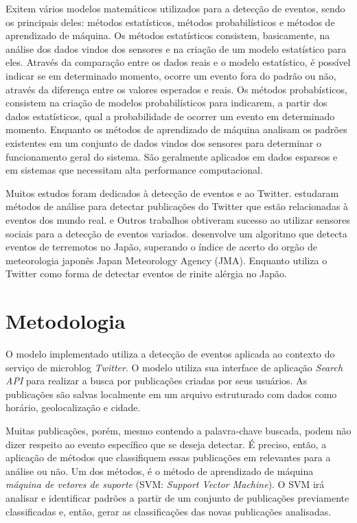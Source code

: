 Exitem vários modelos matemáticos utilizados para a detecção de eventos, sendo os principais deles: métodos estatísticos, métodos probabilísticos e métodos de aprendizado de máquina. Os métodos estatísticos consistem, basicamente, na análise dos dados vindos dos sensores e na criação de um modelo estatístico para eles. Através da comparação entre os dados reais e o modelo estatístico, é possível indicar se em determinado momento, ocorre um evento fora do padrão ou não, através da diferença entre os valores esperados e reais. Os métodos probabísticos, consistem na criação de modelos probabilísticos para indicarem, a partir dos dados estatísticos, qual a probabilidade de ocorrer um evento em determinado momento. Enquanto os métodos de aprendizado de máquina analisam os padrões existentes em um conjunto de dados vindos dos sensores para determinar o funcionamento geral do sistema. São geralmente aplicados em dados esparsos e em sistemas que necessitam alta performance computacional.

Muitos estudos foram dedicados à detecção de eventos e ao Twitter.  estudaram métodos de análise para detectar publicações do Twitter que estão relacionadas à eventos dos mundo real.  e  Outros trabalhos obtiveram sucesso ao utilizar sensores sociais para a detecção de eventos variados.  desenvolve um algoritmo que detecta eventos de terremotos no Japão, superando o índice de acerto do orgão de meteorologia japonês Japan Meteorology Agency (JMA). Enquanto  utiliza o Twitter como forma de detectar eventos de rinite alérgia no Japão.

\section{Metodologia}

O modelo implementado utiliza a detecção de eventos aplicada ao contexto do serviço de microblog \textit{Twitter}. O modelo utiliza sua interface de aplicação \textit{Search API} para realizar a busca por publicações criadas por seus usuários. As publicações são salvas localmente em um arquivo estruturado com dados como horário, geolocalização e cidade.

Muitas publicações, porém, mesmo contendo a palavra-chave buscada, podem não dizer respeito ao evento específico que se deseja detectar. É preciso, então, a aplicação de métodos que classifiquem essas publicações em relevantes para a análise ou não. Um dos métodos, é o método de aprendizado de máquina \textit{máquina de vetores de suporte} (SVM: \textit{Support Vector Machine}). O SVM irá analisar e identificar padrões a partir de um conjunto de publicações previamente classificadas e, então, gerar as classificações das novas publicações analisadas.

